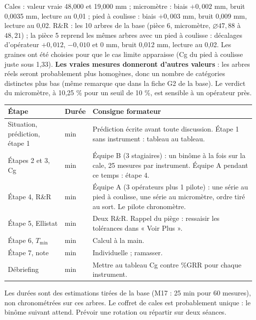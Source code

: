 \documentclass[10pt,a4paper]{article}
\begin{document}
Cales : valeur vraie 48,000 et 19,000 mm ; micromètre : biais $+0{,}002$ mm, bruit 0,0035 mm, lecture au 0,01 ; pied à coulisse : biais $+0{,}003$ mm, bruit 0,009 mm, lecture au 0,02. R\&R : les 10 arbres de la base (pièce 6, micromètre, $\varnothing 47{,}88$ à $48{,}21$) ; la pièce 5 reprend les mêmes arbres avec un pied à coulisse : décalages d'opérateur $+0{,}012$, $-0{,}010$ et $0$ mm, bruit 0,012 mm, lecture au 0,02. Les graines ont été choisies pour que le cas limite apparaisse (Cg du pied à coulisse juste sous 1,33). \textbf{Les vraies mesures donneront d'autres valeurs} : les arbres réels seront probablement plus homogènes, donc un nombre de catégories distinctes plus bas (même remarque que dans la fiche G2 de la base). Le verdict du micromètre, à 10,25 \% pour un seuil de 10 \%, est sensible à un opérateur près.

\begin{tabularx}{\linewidth}{|>{\raggedright\arraybackslash}p{30mm}|>{\centering\arraybackslash}p{14mm}|X|}
\hline
\rowcolor{fond}\textbf{Étape} & \textbf{Durée} & \textbf{Consigne formateur}\\\hline
Situation, prédiction, étape 1 & 25 min & Prédiction écrite avant toute discussion. Étape 1 sans instrument : tableau au tableau.\\\hline
Étapes 2 et 3, Cg & 45 min & Équipe B (3 stagiaires) : un binôme à la fois sur la cale, 25 mesures par instrument. Équipe A pendant ce temps : étape 4.\\\hline
Étape 4, R\&R & 60 min & Équipe A (3 opérateurs plus 1 pilote) : une série au pied à coulisse, une série au micromètre, ordre tiré au sort. Le pilote chronomètre.\\\hline
Étape 5, Ellistat & 30 min & Deux R\&R. Rappel du piège : ressaisir les tolérances dans « Voir Plus ».\\\hline
Étape 6, $T_{\min}$ & 10 min & Calcul à la main.\\\hline
Étape 7, note & 30 min & Individuelle ; ramasser.\\\hline
Débriefing & 10 min & Mettre au tableau Cg contre \%GRR pour chaque instrument.\\\hline
\end{tabularx}
{\footnotesize Les durées sont des estimations tirées de la base (M17 : 25 min pour 60 mesures), non chronométrées sur ces arbres. Le coffret de cales est probablement unique : le binôme suivant attend. Prévoir une rotation ou répartir sur deux séances.}
\end{document}
